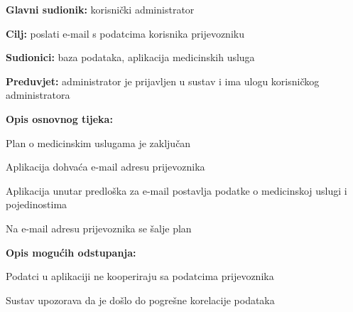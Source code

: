      			\noindent {}
					\begin{packed_item}
	
						\item \textbf{Glavni sudionik: }korisnički administrator
						\item  \textbf{Cilj:} poslati e-mail s podatcima korisnika prijevozniku
						\item  \textbf{Sudionici:} baza podataka, aplikacija medicinskih usluga
						\item  \textbf{Preduvjet:} administrator je prijavljen u sustav i ima ulogu korisničkog administratora 
						\item  \textbf{Opis osnovnog tijeka:}
						
						\item[] \begin{packed_enum}
	
							\item Plan o medicinskim uslugama je zaključan
       				\item Aplikacija dohvaća e-mail adresu prijevoznika
       				\item Aplikacija unutar predloška za e-mail postavlja podatke o medicinskoj uslugi i pojedinostima 
	   			\item Na e-mail adresu prijevoznika se šalje plan 
						\end{packed_enum}

      						\item  \textbf{Opis mogućih odstupanja:}
						
						\item[] \begin{packed_item}
	
							\item[3.a] Podatci u aplikaciji ne kooperiraju sa podatcima prijevoznika
							\item[] \begin{packed_enum}
								
								\item Sustav upozorava da je došlo do pogrešne korelacije podataka
								
							\end{packed_enum}
							
						\end{packed_item}
						
					\end{packed_item}


